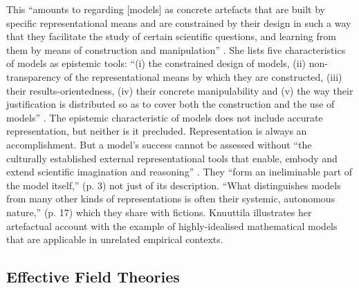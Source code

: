 This ``amounts to regarding [models] as concrete artefacts that are built by specific representational means and are constrained by their design in such a way that they facilitate the study of certain scientific questions, and learning from them by means of construction and manipulation'' \citep[p.~262]{knuuttila2011}.
She lists five characteristics of models as epistemic tools:
``(i) the constrained design of models, (ii) non-transparency of the representational means by which they are constructed, (iii) their results-orientedness, (iv) their concrete manipulability and (v) the way their justification is distributed so as to cover both the construction and the use of models'' \citep[p.~267]{knuuttila2011}.
The epistemic characteristic of models does not include accurate representation, but neither is it precluded.
Representation is always an accomplishment. 
But a model's success cannot be assessed without ``the culturally established external representational tools that enable, embody and extend scientific imagination and reasoning'' \citep[p.~1]{Knuuttila2017}. 
They ``form an ineliminable part of the model itself,'' (p. 3) not just of its description. 
``What distinguishes models from many other kinds of representations is often their systemic, autonomous nature,'' (p. 17) which they share with fictions.
Knuuttila illustrates her artefactual account with the example of highly-idealised mathematical models that are applicable in unrelated empirical contexts. 


\subsection{Effective Field Theories}\label{PhilEFT}

